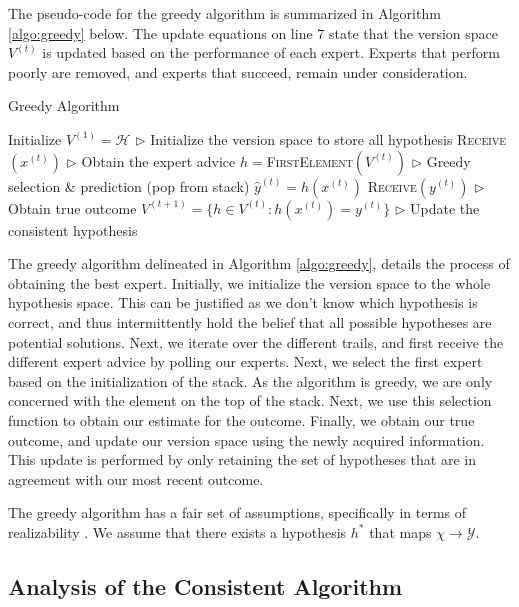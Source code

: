 \documentclass[11pt]{article}
\begin{document}
The pseudo-code for the greedy algorithm is summarized in Algorithm \ref{algo:greedy} below. The update equations on line 7 state that the version space $V^{(t)}$ is updated based on the performance of each expert. Experts that perform poorly are removed, and experts that succeed, remain under consideration.

\begin{algorithm}[H]
\caption{Greedy Algorithm}
\label{algo:greedy}
\begin{algorithmic}[1]
\STATE Initialize $V^{(1)} = \mathcal{H}$ \hfill $\triangleright$ Initialize the version space to store all hypothesis
    \STATE \textsc{Receive}$(x^{(t)})$ \hfill $\triangleright$ Obtain the expert advice
    \STATE $h=$\textsc{FirstElement}$(V^{(t)})$  \hfill $\triangleright$ Greedy selection \& prediction (pop from stack)
    \STATE $\hat{y}^{(t)}=h(x^{(t)})$
    \STATE \textsc{Receive}$(y^{(t)})$ \hfill $\triangleright$ Obtain true outcome
    \STATE $V^{(t+1)}=\{h \in V^{(t)} : h(x^{(t)})= y^{(t)}\}$  \hfill $\triangleright$ Update the consistent hypothesis
\ENDFOR

\end{algorithmic}
\end{algorithm}

The greedy algorithm delineated in Algorithm \ref{algo:greedy}, details the process of obtaining the best expert. Initially, we initialize the version space to the whole hypothesis space. This can be justified as we don't know which hypothesis is correct, and thus intermittently hold the belief that all possible hypotheses are potential solutions. Next, we iterate over the different trails, and first receive the different expert advice by polling our experts. Next, we select the first expert based on the initialization of the stack. As the algorithm is greedy, we are only concerned with the element on the top of the stack. Next, we use this selection function to obtain our estimate for the outcome. Finally, we obtain our true outcome, and update our version space using the newly acquired information. This update is performed by only retaining the set of hypotheses that are in agreement with our most recent outcome. 

The greedy algorithm has a fair set of assumptions, specifically in terms of realizability \cite{ohta1984reachability}. We assume that there exists a hypothesis $h^*$ that maps $\chi \to \mathcal{Y}$.

\subsection{Analysis of the Consistent Algorithm}
\end{document}
